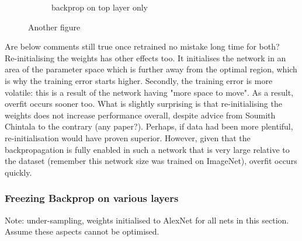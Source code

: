 \documentclass[a4paper,11pt]{article}
\begin{document}
\begin{figure}
\begin{minipage}[b]{\textwidth}
\begin{subfigure}{.5\textwidth}
        \caption{backprop on top layer only}\label{fig:2b}
      \end{subfigure} \par \vspace*{20pt} %
      \caption{Another figure}\label{fig:2}
    \end{minipage}%
\end{figure}

Are below comments still true once retrained no mistake long time for both? \\

Re-initialising the weights has other effects too. It initialises the network in an area of the parameter space which is further away from the optimal region, which is why the training error starts higher. Secondly, the training error is more volatile: this is a result of the network having "more space to move". As a result, overfit occurs sooner too. What is slightly surprising is that re-initialising the weights does not increase performance overall, despite advice from Soumith Chintala to the contrary (any paper?). Perhaps, if data had been more plentiful, re-initialisation would have proven superior. However, given that the backpropagation is fully enabled in such a network that is very large relative to the dataset (remember this network size was trained on ImageNet), overfit occurs quickly. \\


\subsubsection{Freezing Backprop on various layers}

Note: under-sampling, weights initialised to AlexNet for all nets in this section. Assume these aspects cannot be optimised. \\
\end{document}
